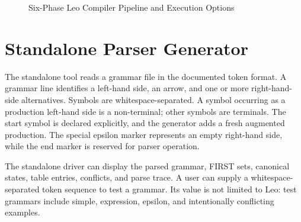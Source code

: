 \documentclass[12pt,a4paper,oneside]{report}
\begin{document}
\begin{figure}[H]
\centering
{}
\caption{Six-Phase Leo Compiler Pipeline and Execution Options}
\label{fig:pipeline}
\end{figure}

\section{Standalone Parser Generator}
The standalone tool reads a grammar file in the documented token format. A grammar line identifies a left-hand side, an arrow, and one or more right-hand-side alternatives. Symbols are whitespace-separated. A symbol occurring as a production left-hand side is a non-terminal; other symbols are terminals. The start symbol is declared explicitly, and the generator adds a fresh augmented production. The special epsilon marker represents an empty right-hand side, while the end marker is reserved for parser operation.

The standalone driver can display the parsed grammar, FIRST sets, canonical states, table entries, conflicts, and parse trace. A user can supply a whitespace-separated token sequence to test a grammar. Its value is not limited to Leo: test grammars include simple, expression, epsilon, and intentionally conflicting examples.
\end{document}
